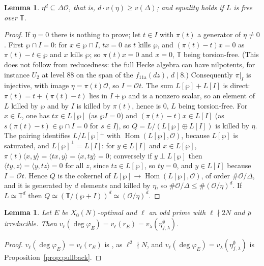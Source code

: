 \documentclass[11pt]{amsart}
\newtheorem{lemma}[theorem]{Lemma}
\theoremstyle{definition}
\newcommand{\T}{\mathbb{T}}
\newcommand{\degphi}{\deg\varphi_E}
\begin{document}
\begin{lemma}\label{lem:ddt417}
$\eta^d\subseteq\Delta\mathcal{O}$, that is, $d\cdot v(\eta)\ge v(\Delta)$; and equality holds if $L$ is free over $\T$.
\end{lemma}
\begin{proof}
If $\eta=0$ there is nothing to prove; let $t\in I$ with $\pi(t)$ a generator of $\eta\ne0$. First $\wp\cap I=0$: for $x\in\wp\cap I$, $tx=0$ as $t$ kills $\wp$, and $(\pi(t)-t)x=0$ as $\pi(t)-t\in\wp$ and $x$ kills $\wp$; so $\pi(t)x=0$ and $x=0$, $\T$ being torsion-free. (This does not follow from reducedness: the full Hecke algebra can have nilpotents, for instance $U_2$ at level $88$ on the span of the $f_{\text{11a}}(dz)$, $d\mid8$.) Consequently $\pi|_I$ is injective, with image $\eta=\pi(t)\mathcal{O}$, so $I=\mathcal{O}t$. The sum $L[\wp]+L[I]$ is direct: $\pi(t)=t+(\pi(t)-t)$ lies in $I+\wp$ and is a nonzero scalar, so an element of $L$ killed by $\wp$ and by $I$ is killed by $\pi(t)$, hence is $0$, $L$ being torsion-free. For $x\in L$, one has $tx\in L[\wp]$ (as $\wp I=0$) and $(\pi(t)-t)x\in L[I]$ (as $s(\pi(t)-t)\in\wp\cap I=0$ for $s\in I$), so $Q=L/(L[\wp]\oplus L[I])$ is killed by $\eta$. The pairing identifies $L/L[\wp]^\perp$ with $\operatorname{Hom}(L[\wp],\mathcal{O})$, because $L[\wp]$ is saturated, and $L[\wp]^\perp=L[I]$: for $y\in L[I]$ and $x\in L[\wp]$, $\pi(t)\langle x,y\rangle=\langle tx,y\rangle=\langle x,ty\rangle=0$; conversely if $y\perp L[\wp]$ then $\langle ty,z\rangle=\langle y,tz\rangle=0$ for all $z$, since $tz\in L[\wp]$, so $ty=0$, and $y\in L[I]$ because $I=\mathcal{O}t$. Hence $Q$ is the cokernel of $L[\wp]\to\operatorname{Hom}(L[\wp],\mathcal{O})$, of order $\#\mathcal{O}/\Delta$, and it is generated by $d$ elements and killed by $\eta$, so $\#\mathcal{O}/\Delta\le\#(\mathcal{O}/\eta)^d$. If $L\simeq\T^d$ then $Q\simeq(\T/(\wp+I))^d\simeq(\mathcal{O}/\eta)^d$.
\end{proof}

\begin{lemma}\label{lem:hecke}
Let $E$ be $X_0(N)$-optimal and $\ell$ an odd prime with $\ell\nmid 2N$ and $\bar\rho$ irreducible. Then $v_\ell(\degphi)=v_\ell(r_E)=v_\lambda(\eta^\emptyset_{f,\lambda})$.
\end{lemma}
\begin{proof}
$v_\ell(\degphi)=v_\ell(r_E)$ is \cite[Theorem 2.2]{ARS12}, as $\ell^2\nmid N$, and $v_\ell(\degphi)=v_\lambda(\eta^\emptyset_{f,\lambda})$ is Proposition~\ref{prop:pullback}.
\end{proof}
\end{document}
